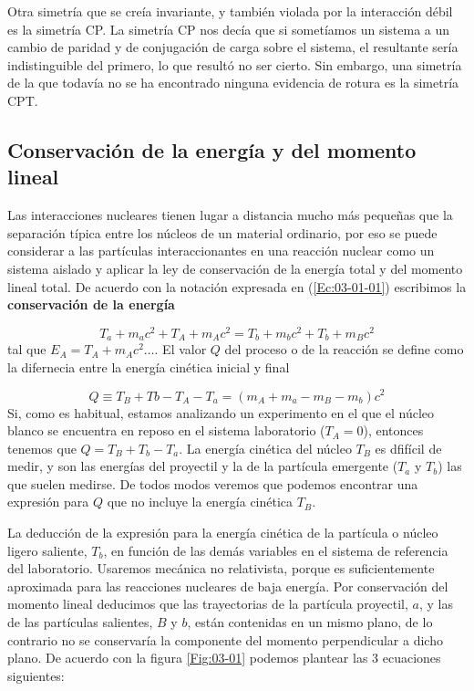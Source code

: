 Otra simetría que se creía invariante, y también violada por la interacción débil es la simetría CP. La simetría CP nos decía que si sometíamos un sistema a un cambio de paridad y de conjugación de carga sobre el sistema, el resultante sería indistinguible del primero, lo que resultó no ser cierto. Sin embargo, una simetría de la que todavía no se ha encontrado ninguna evidencia de rotura es la simetría CPT.

\subsection{Conservación de la energía y del momento lineal}

Las interacciones nucleares tienen lugar a distancia mucho más pequeñas que la separación típica entre los núcleos de un material ordinario, por eso se puede considerar a las partículas interaccionantes en una reacción nuclear como un sistema aislado y aplicar la ley de conservación de la energía total y del momento lineal total. De acuerdo con la notación expresada en (\ref{Ec:03-01-01}) escribimos la \textbf{conservación de la energía}

\begin{equation}
    T_a + m_a c^2 +T_A+m_A c^2 = T_b +m_bc^2 + T_b + m_Bc^2
\end{equation}
tal que $E_A = T_A + m_Ac^2\ldots$. El valor $Q$ del proceso o de la reacción se define como la difernecia entre la energía cinética inicial y final 

\begin{equation}
    Q \equiv T_B + Tb - T_A - T_a = (m_A + m_a - m_B - m_b) c^2
\end{equation}
Si, como es habitual, estamos analizando un experimento en el que el núcleo blanco se encuentra en reposo en el sistema laboratorio ($T_A=0$), entonces tenemos que $Q = T_B + T_b - T_a$. La energía cinética del núcleo $T_B$ es dfifícil de medir, y son las energías del proyectil y la de la partícula emergente ($T_a$ y $T_b$) las que suelen medirse. De todos modos veremos que podemos encontrar una expresión para $Q$ que no incluye la energía cinética $T_B$. 

La deducción de la expresión para la energía cinética de la partícula o núcleo ligero saliente, $T_b$, en función de las demás variables en el sistema de referencia del laboratorio. Usaremos mecánica no relativista, porque es suficientemente aproximada para las reacciones nucleares de baja energía. Por conservación del momento lineal deducimos que las trayectorias de la partícula proyectil, $a$, y las de las partículas salientes, $B$ y $b$, están contenidas en un mismo plano, de lo contrario no se conservaría la componente del momento perpendicular a dicho plano. De acuerdo con la figura \ref{Fig:03-01} podemos plantear las 3 ecuaciones siguientes:

